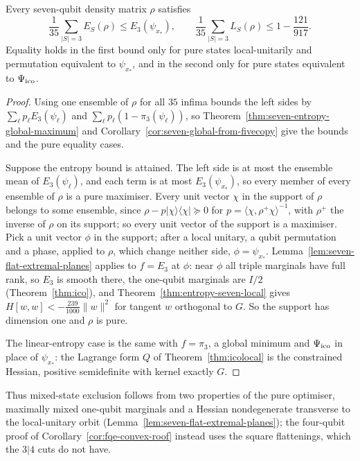 \begin{proposition}\label{prop:seven-mixed-roofs}
Every seven-qubit density matrix $\rho$ satisfies
\[
 \frac1{35}\sum_{|S|=3}E_S(\rho)\le E_3(\psi_{x_*}),\qquad \frac1{35}\sum_{|S|=3}L_S(\rho)\le1-\frac{121}{917}.
\]
Equality holds in the first bound only for pure states local-unitarily and permutation equivalent to $\psi_{x_*}$, and in
the second only for pure states equivalent to $\Psi_{\mathrm{ico}}$.
\end{proposition}
\begin{proof}
Using one ensemble of $\rho$ for all $35$ infima bounds the left sides by $\sum_\ell p_\ell E_3(\psi_\ell)$ and
$\sum_\ell p_\ell(1-\pi_3(\psi_\ell))$, so Theorem~\ref{thm:seven-entropy-global-maximum} and
Corollary~\ref{cor:seven-global-from-fivecopy} give the bounds and the pure equality cases.

Suppose the entropy bound is attained. The left side is at most the ensemble mean of $E_3(\psi_\ell)$, and each term is
at most $E_3(\psi_{x_*})$, so every member of every ensemble of $\rho$ is a pure maximiser. Every unit
vector $\chi$ in the support of $\rho$ belongs to some ensemble, since $\rho-p|\chi\rangle\langle\chi|\succeq0$ for
$p=\langle\chi,\rho^+\chi\rangle^{-1}$, with $\rho^+$ the inverse of $\rho$ on its support; so every unit vector of the
support is a maximiser. Pick a unit vector $\phi$ in the support; after a local unitary, a qubit permutation and a phase,
applied to $\rho$, which change neither side, $\phi=\psi_{x_*}$. Lemma~\ref{lem:seven-flat-extremal-planes} applies to
$f=E_3$ at $\phi$: near $\phi$ all triple marginals have full rank, so $E_3$ is smooth there, the one-qubit marginals are
$I/2$ (Theorem~\ref{thm:ico}), and Theorem~\ref{thm:entropy-seven-local} gives $H[w,w]<-\frac{239}{1000}\|w\|^2$ for tangent $w$
orthogonal to $G$. So the support has dimension one and $\rho$ is pure.

The linear-entropy case is the same with $f=\pi_3$, a global minimum and $\Psi_{\mathrm{ico}}$ in place of $\psi_{x_*}$: the Lagrange form
$Q$ of Theorem~\ref{thm:icolocal} is the constrained Hessian, positive semidefinite with kernel exactly $G$.
\end{proof}
Thus mixed-state exclusion follows from two properties of the pure optimiser, maximally mixed one-qubit marginals
and a Hessian nondegenerate transverse to the local-unitary orbit (Lemma~\ref{lem:seven-flat-extremal-planes}); the
four-qubit proof of
Corollary~\ref{cor:fqe-convex-roof} instead uses the square flattenings, which the $3|4$ cuts do not have.
